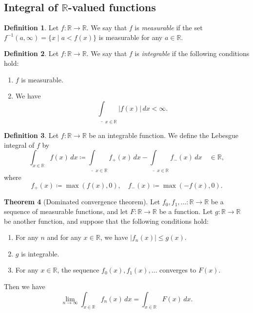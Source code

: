 \documentclass{article}
\theoremstyle{definition}
\newtheorem{theorem}{Theorem}[section]
\newtheorem{definition}[theorem]{Definition}
\begin{document}
\subsection{Integral of $\mathbb{R}$-valued functions}

\begin{definition}
  Let $f : \mathbb{R} \to \mathbb{R}$.
  We say that $f$ is \emph{measurable} if
  the set $f^{-1} (a, \infty) = \{ x \mid a < f(x) \}$ is measurable for any $a \in \mathbb{R}$.
\end{definition}

\begin{definition}
  Let $f : \mathbb{R} \to \mathbb{R}$.
  We say that $f$ is \emph{integrable} if the following conditions hold:
  \begin{enumerate}
    \item $f$ is measurable.
    \item We have
    \begin{equation*}
      \underline{\int}_{x \in \mathbb{R}} \lvert f (x) \rvert \, dx < \infty.
    \end{equation*}
  \end{enumerate}
\end{definition}

\begin{definition}
  Let $f : \mathbb{R} \to \mathbb{R}$ be an integrable function.
  We define the Lebesgue integral of $f$ by
  \begin{equation*}
    \int_{x \in \mathbb{R}} f (x) \, dx 
      \coloneqq \underline{\int}_{x \in \mathbb{R}} f_+ (x) \, dx
        - \underline{\int}_{x \in \mathbb{R}} f_- (x) \, dx \quad \in \mathbb{R},
  \end{equation*}
  where
  \begin{equation*}
    f_+ (x) \coloneqq \max ( f(x), 0 ), \quad
    f_- (x) \coloneqq \max ( -f(x), 0 ).
  \end{equation*}
\end{definition}

\begin{theorem}[Dominated convergence theorem]
  Let $f_0, f_1, \dots : \mathbb{R} \to \mathbb{R}$ be
  a sequence of measurable functions,
  and let $F : \mathbb{R} \to \mathbb{R}$ be a function.
  Let $g : \mathbb{R} \to \mathbb{R}$ be another function, and 
  suppose that the following conditions hold:
  \begin{enumerate}
    \item For any $n$ and for any $x \in \mathbb{R}$,
      we have $\lvert f_n (x) \rvert \leq g (x)$.
    \item $g$ is integrable.
    \item For any $x \in \mathbb{R}$,
      the sequence $f_0 (x), f_1 (x), \dots$ converges to $F (x)$.
  \end{enumerate}
  Then we have
  \begin{equation*}
    \lim_{n \to \infty} \int_{x \in \mathbb{R}} f_n (x) \, dx
      = \int_{x \in \mathbb{R}} F (x) \, dx.
  \end{equation*}
\end{theorem}
\end{document}

